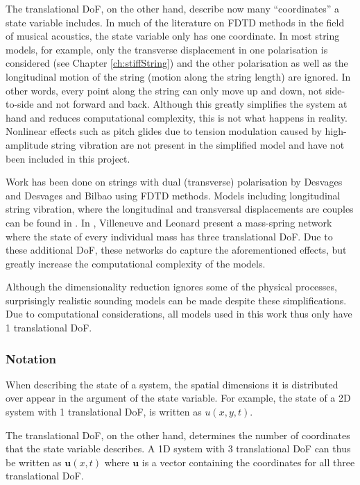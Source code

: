 The translational DoF, on the other hand, describe now many ``coordinates'' a state variable includes. 
In much of the literature on FDTD methods in the field of musical acoustics, the state variable only has one coordinate. In most string models, for example, only the transverse displacement in one polarisation is considered (see Chapter \ref{ch:stiffString}) and the other polarisation as well as the longitudinal motion of the string (motion along the string length) are ignored. In other words, every point along the string can only move up and down, not side-to-side and not forward and back. Although this greatly simplifies the system at hand and reduces computational complexity, this is not what happens in reality. Nonlinear effects such as pitch glides due to tension modulation caused by high-amplitude string vibration are not present in the simplified model and have not been included in this project. 

Work has been done on strings with dual (transverse) polarisation by Desvages \cite{Desvages2018} and Desvages and Bilbao \cite{Desvages2016} using FDTD methods. Models including longitudinal string vibration, where the longitudinal and transversal displacements are couples can be found in \cite{theBible,Bilbao2009spring}.
In \cite{Villeneuve2019}, Villeneuve and Leonard present a mass-spring network where the state of every individual mass has three translational DoF. Due to these additional DoF, these networks do capture the aforementioned effects, but greatly increase the computational complexity of the models.

Although the dimensionality reduction ignores some of the physical processes, surprisingly realistic sounding models can be made despite these simplifications. Due to computational considerations, all models used in this work thus only have 1 translational DoF.

\subsubsection{Notation}
When describing the state of a system, the spatial dimensions it is distributed over appear in the argument of the state variable. For example, the state of a 2D system with 1 translational DoF, is written as $u(x,y,t)$.

The translational DoF, on the other hand, determines the number of coordinates that the state variable describes. A 1D system with 3 translational DoF can thus be written as $\mathbf{u}(x,t)$ where $\mathbf{u}$ is a vector containing the coordinates for all three translational DoF.  

